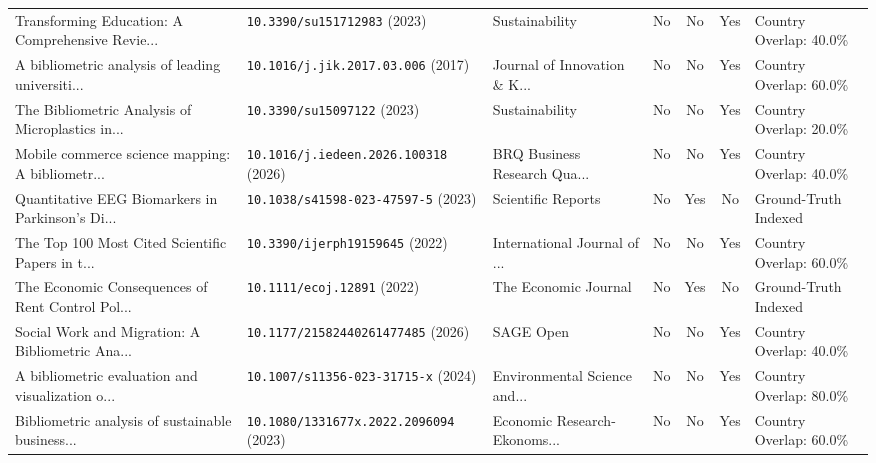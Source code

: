 \begin{table}[t]
{\begin{tabular}{P{4.5cm}P{3.8cm}P{3.5cm}cccP{3.2cm}}
Transforming Education: A Comprehensive Revie... & {\footnotesize\nolinkurl{10.3390/su151712983}} (2023) & Sustainability & No & No & Yes & Country Overlap: 40.0\% \\
A bibliometric analysis of leading universiti... & {\footnotesize\nolinkurl{10.1016/j.jik.2017.03.006}} (2017) & Journal of Innovation \& K... & No & No & Yes & Country Overlap: 60.0\% \\
The Bibliometric Analysis of Microplastics in... & {\footnotesize\nolinkurl{10.3390/su15097122}} (2023) & Sustainability & No & No & Yes & Country Overlap: 20.0\% \\
Mobile commerce science mapping: A bibliometr... & {\footnotesize\nolinkurl{10.1016/j.iedeen.2026.100318}} (2026) & BRQ Business Research Qua... & No & No & Yes & Country Overlap: 40.0\% \\
Quantitative EEG Biomarkers in Parkinson's Di... & {\footnotesize\nolinkurl{10.1038/s41598-023-47597-5}} (2023) & Scientific Reports & No & Yes & No & Ground-Truth Indexed \\
The Top 100 Most Cited Scientific Papers in t... & {\footnotesize\nolinkurl{10.3390/ijerph19159645}} (2022) & International Journal of ... & No & No & Yes & Country Overlap: 60.0\% \\
The Economic Consequences of Rent Control Pol... & {\footnotesize\nolinkurl{10.1111/ecoj.12891}} (2022) & The Economic Journal & No & Yes & No & Ground-Truth Indexed \\
Social Work and Migration: A Bibliometric Ana... & {\footnotesize\nolinkurl{10.1177/21582440261477485}} (2026) & SAGE Open & No & No & Yes & Country Overlap: 40.0\% \\
A bibliometric evaluation and visualization o... & {\footnotesize\nolinkurl{10.1007/s11356-023-31715-x}} (2024) & Environmental Science and... & No & No & Yes & Country Overlap: 80.0\% \\
Bibliometric analysis of sustainable business... & {\footnotesize\nolinkurl{10.1080/1331677x.2022.2096094}} (2023) & Economic Research-Ekonoms... & No & No & Yes & Country Overlap: 60.0\% \\
\hline
\end{tabular}%
}
\end{table}
